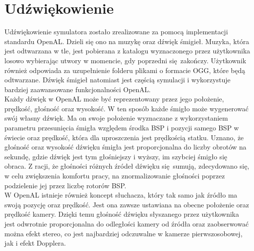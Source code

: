 \section{Udźwiękowienie}

Udźwiękowienie symulatora zostało zrealizowane za pomocą implementacji standardu OpenAL. Dzieli się ono na muzykę oraz dźwięk śmigieł. Muzyka, która jest odtwarzana w tle, jest pobierana z katalogu wyznaczonego przez użytkownika losowo wybierając utwory w momencie, gdy poprzedni się zakończy. Użytkownik również odpowiada za uzupełnienie folderu plikami o formacie OGG, które będą odtwarzane. Dźwięk śmigieł natomiast jest częścią symulacji i wykorzystuje bardziej zaawansowane funkcjonalności OpenAL. 
\\

Każdy dźwięk w OpenAL może być reprezentowany przez jego położenie, prędkość, głośność oraz wysokość. W ten sposób każde śmigło może wygenerować swój własny dźwięk. Ma on swoje położenie wyznaczane z wykorzystaniem parametru przesunięcia śmigła względem środka BSP i pozycji samego BSP w świecie oraz prędkość, która dla uproszczenia jest prędkością statku. Uznano, że głośność oraz wysokość dźwięku śmigła jest proporcjonalna do liczby obrotów na sekundę, gdzie dźwięk jest tym głośniejszy i wyższy, im szybciej śmigło się obraca. Z racji, że głośności różnych źródeł dźwięku się sumują, zdecydowano się, w celu zwiększenia komfortu pracy, na znormalizowanie głośności poprzez podzielenie jej przez liczbę rotorów BSP. 
\\

W OpenAL istnieje również koncept słuchacza, który tak samo jak źródło ma swoją pozycję oraz prędkość. Jest ona zawsze ustawiana na obecne położenie oraz prędkość kamery. Dzięki temu głośność dźwięku słyszanego przez użytkownika jest odwrotnie proporcjonalna do odległości kamery od źródła oraz zaobserwować można efekt stereo, co jest najbardziej odczuwalne w kamerze pierwszosobowej, jak i efekt Dopplera.
\\